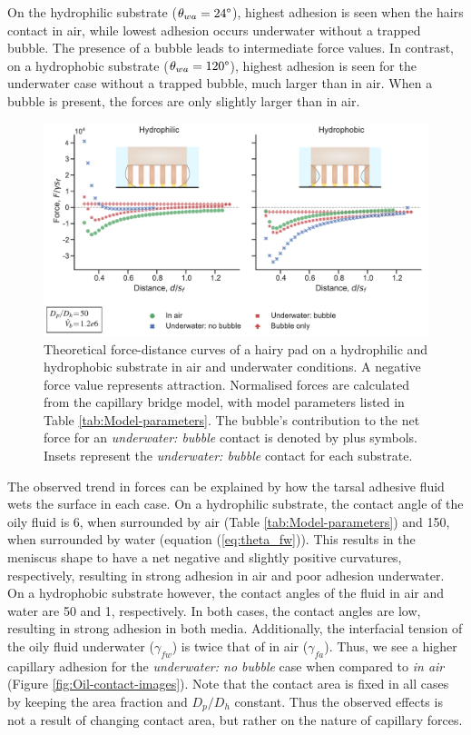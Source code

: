 \documentclass[vruler,JEB]{COB}%
\makeatletter
\newcommand{\lyxmathsym}[1]{\ifmmode\begingroup\def\b@ld{bold}
  \text{\ifx\math@version\b@ld\bfseries\fi#1}\endgroup\else#1\fi}
\makeatother
\begin{document}
On the hydrophilic substrate ($\theta_{wa}=24\lyxmathsym{\textdegree}$),
highest adhesion is seen when the hairs contact in air, while lowest
adhesion occurs underwater without a trapped bubble. The presence
of a bubble leads to intermediate force values. In contrast, on a
hydrophobic substrate ($\theta_{wa}=120\lyxmathsym{\textdegree}$),
highest adhesion is seen for the underwater case without a trapped
bubble, much larger than in air. When a bubble is present, the forces
are only slightly larger than in air. 

\begin{figure}
\centering
\includegraphics[width=6in]{Figure5-Model_effect_of_substrate}\caption{\label{fig:Effect-of-substrate}Theoretical force-distance curves
of a hairy pad on a hydrophilic and hydrophobic substrate in
air and underwater conditions. A negative force value represents attraction.
Normalised forces are calculated from the capillary bridge model,
with model parameters listed in Table \ref{tab:Model-parameters}.
The bubble's contribution to the net force for an \emph{underwater:
bubble} contact is denoted by plus symbols. Insets represent the \emph{underwater:
bubble }contact for each substrate.}
\end{figure}

The observed trend in forces can be explained by how the tarsal adhesive
fluid wets the surface in each case. On a hydrophilic substrate, the
contact angle of the oily fluid is 6\textdegree , when surrounded
by air (Table \ref{tab:Model-parameters}) and 150\textdegree , when
surrounded by water (equation (\ref{eq:theta_fw})). This results
in the meniscus shape to have a net negative and slightly positive
curvatures, respectively, resulting in strong adhesion in air and
poor adhesion underwater. On a hydrophobic substrate however, the
contact angles of the fluid in air and water are 50\textdegree{} and
1\textdegree , respectively. In both cases, the contact angles are
low, resulting in strong adhesion in both media. Additionally, the
interfacial tension of the oily fluid underwater ($\gamma_{fw}$)
is twice that of in air ($\gamma_{fa}$). Thus, we see a higher capillary
adhesion for the \emph{underwater: no bubble} case when compared to
\emph{in air} (Figure \ref{fig:Oil-contact-images}). Note that the
contact area is fixed in all cases by keeping the area fraction and
$D_{p}/D_{h}$ constant. Thus the observed effects is not a result
of changing contact area, but rather on the nature of capillary forces.
\end{document}
